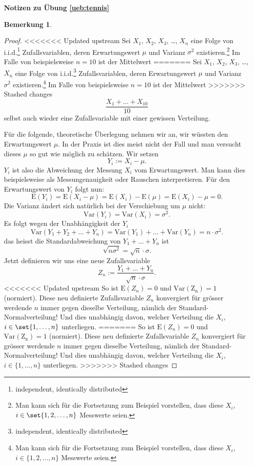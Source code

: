 \documentclass[%
<<<<<<< Updated upstream
11pt,%
twoside,%
titlepage,%
german,%
=======
11pt,%
twoside,%
titlepage,%
swissgerman,%
>>>>>>> Stashed changes
headsepline%
]{scrartcl}
\newcommand{\faReturnGray}{\textcolor{gray}{\faMailReply}} %
\newcommand{\definition}[1]{\colorbox{emerald}{#1}}
\theoremstyle{definition}
\newtheorem{bem}{Bemerkung}[subsection] %
\theoremstyle{plain}
\newcommand{\concatueb}[1]{ueb:#1}%
\newcommand{\concatlsg}[1]{lsg:#1}%
\newenvironment{lsg}[1]{%
    \par\noindent\textbf{Notizen zu Übung \ref{\concatueb{#1}}}\label{\concatlsg{#1}}
    \hfill\hyperref[\concatueb{#1}]{\faReturnGray}\par %
}{%
    \par%
}
\newcounter{theo}[section]\setcounter{theo}{0}
\newcommand{\concatueb}[1]{ueb:#1}%
\newcommand{\concatlsg}[1]{lsg:#1}%
\newenvironment{lsg}[1]{%
    \par\noindent\textbf{Notizen zu Übung \ref{\concatueb{#1}}.}%
    \label{\concatlsg{#1}}
}{%
    \par%
}
\newcommand{\definition}[1]{\colorbox{emerald}{#1}}
\begin{document}
\begin{lsg}{tennis}
\begin{bem}
\begin{proof}
<<<<<<< Updated upstream
Sei $X_1$, $X_2$, $X_3$, \dots , $X_n$ eine Folge von i.i.d.\footnote{independent, identically distributed} Zufallsvariablen, deren Erwartungswert $\mu$ und Varianz $\sigma^2$ existieren.\footnote{Man kann sich für die Fortsetzung zum Beispiel vorstellen, dass diese $X_i$, $i\in\set{1,2,\dots,n}$ Messwerte seien.} Im Falle von beispielsweise $n=10$ ist der Mittelwert
=======
Sei $X_1$, $X_2$, $X_3$, \dots , $X_n$ eine Folge von i.i.d.\footnote{independent, identically distributed} Zufallsvariablen, deren Erwartungswert $\mu$ und Varianz $\sigma^2$ existieren.\footnote{Man kann sich für die Fortsetzung zum Beispiel vorstellen, dass diese $X_i$, $i\in\{1,2,\dots,n\}$ Messwerte seien.} Im Falle von beispielsweise $n=10$ ist der Mittelwert
>>>>>>> Stashed changes
$$\frac{X_1+\dots+X_{10}}{10}$$
selbst auch wieder eine Zufallsvariable mit einer gewissen Verteilung.

Für die folgende, theoretische Überlegung nehmen wir an, wir wüssten den Erwartungswert $\mu$. In der Praxis ist dies meist nicht der Fall und man versucht dieses $\mu$ so gut wie möglich zu schätzen. Wir setzen
$$Y_i:=X_i-\mu.$$
$Y_i$ ist also die Abweichung der Messung $X_i$ vom Erwartungswert. Man kann dies beispielsweise als Messungenauigkeit oder Rauschen interpretieren. Für den Erwartungswert von $Y_i$ folgt nun:
$$\mathrm{E}(Y_i)=\mathrm{E}(X_i-\mu)=\mathrm{E}(X_i)-\mathrm{E}(\mu)=\mathrm{E}(X_i)-\mu=0.$$
Die Varianz ändert sich natürlich bei der Verschiebung um $\mu$ nicht:
$$\mathrm{Var}(Y_i)=\mathrm{Var}(X_i)=\sigma^2.$$
Es folgt wegen der Unabhängigkeit der $Y_i$
$$\mathrm{Var}(Y_1+Y_2+\dots+Y_n)=\mathrm{Var}(Y_1)+\dots+\mathrm{Var}(Y_n)=n\cdot\sigma^2.$$
das heisst die Standardabweichung von $Y_1+\dots+Y_n$ ist
$$\sqrt{n\sigma^2}=\sqrt{n}\cdot\sigma.$$
Jetzt definieren wir uns eine neue Zufallsvariable
$$Z_n:=\frac{Y_1+\dots+Y_n}{\sqrt{n}\cdot\sigma}.$$
<<<<<<< Updated upstream
So ist $\mathrm{E}(Z_n)=0$ und $\mathrm{Var(Z_n)}=1$ (normiert). Diese neu definierte Zufallsvariable $Z_n$ konvergiert für grösser werdende $n$ immer gegen dieselbe Verteilung, nämlich der \definition{Standard-Normalverteilung}! Und dies unabhängig davon, welcher Verteilung die $X_i$, $i\in\set{1,\dots,n}$ unterliegen.
=======
So ist $\mathrm{E}(Z_n)=0$ und $\mathrm{Var(Z_n)}=1$ (normiert). Diese neu definierte Zufallsvariable $Z_n$ konvergiert für grösser werdende $n$ immer gegen dieselbe Verteilung, nämlich der \definition{Standard-Normalverteilung}! Und dies unabhängig davon, welcher Verteilung die $X_i$, $i\in\{1,\dots,n\}$ unterliegen.
>>>>>>> Stashed changes


\end{proof}
\end{bem}
\end{lsg}
\end{document}
